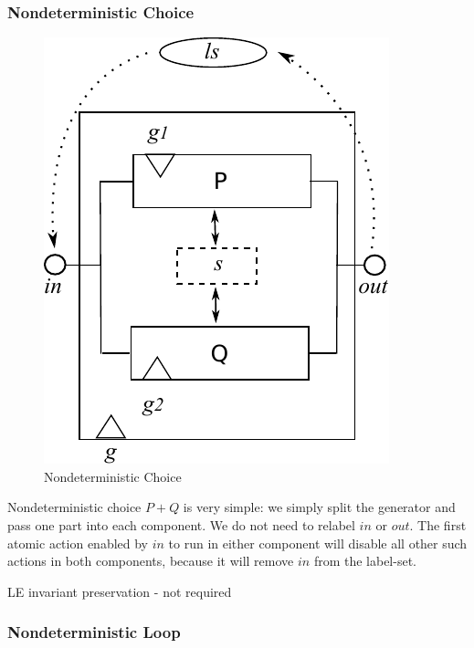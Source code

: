 \newpage
\subsubsection{Nondeterministic Choice}

\begin{figure}[h]
  \centering
  \includegraphics{images/nondet-actual}
  \caption{Nondeterministic Choice}
  \label{fig:nondet-choice}
\end{figure}

Nondeterministic choice $P+Q$ is very simple:
we simply split the generator and pass one part
into each component. We do not need to relabel $in$
or $out$.
The first atomic action enabled by $in$ to
run in either component will disable all other such actions in both components,
because it will remove $in$ from the label-set.




LE invariant preservation - not required


\newpage
\subsubsection{Nondeterministic Loop}

